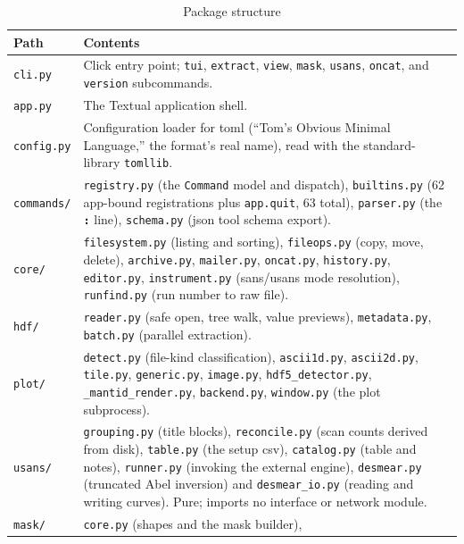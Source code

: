 \documentclass[tm]{ornltm}
\newcommand{\key}[1]{\textbf{\texttt{#1}}}
\begin{document}
\begin{table}[ht]
  \centering
  \caption{Package structure}
  \label{tab:layout}
  \small
  \begin{tabular}{l p{}}
    \toprule
    Path & Contents \\
    \midrule
    \texttt{cli.py} & Click entry point; \texttt{tui}, \texttt{extract},
      \texttt{view}, \texttt{mask}, \texttt{usans}, \texttt{oncat}, and
      \texttt{version} subcommands. \\
    \texttt{app.py} & The Textual application shell. \\
    \texttt{config.py} & Configuration loader for \ac{toml}
      \autocite{toml} (``Tom's Obvious Minimal Language,'' the format's real
      name), read with the standard-library \texttt{tomllib}. \\
    \texttt{commands/} & \texttt{registry.py} (the \texttt{Command} model and
      dispatch), \texttt{builtins.py} (62 app-bound registrations plus
      \texttt{app.quit}, 63 total),
      \texttt{parser.py} (the \key{:} line), \texttt{schema.py} (\ac{json} tool
      schema export). \\
    \texttt{core/} & \texttt{filesystem.py} (listing and sorting),
      \texttt{fileops.py} (copy, move, delete), \texttt{archive.py},
      \texttt{mailer.py}, \texttt{oncat.py}, \texttt{history.py},
      \texttt{editor.py}, \texttt{instrument.py} (\ac{sans}/\ac{usans} mode
      resolution), \texttt{runfind.py} (run number to raw file). \\
    \texttt{hdf/} & \texttt{reader.py} (safe open, tree walk, value previews),
      \texttt{metadata.py}, \texttt{batch.py} (parallel extraction). \\
    \texttt{plot/} & \texttt{detect.py} (file-kind classification),
      \texttt{ascii1d.py}, \texttt{ascii2d.py}, \texttt{tile.py},
      \texttt{generic.py}, \texttt{image.py}, \texttt{hdf5\_detector.py},
      \texttt{\_mantid\_render.py}, \texttt{backend.py}, \texttt{window.py}
      (the plot subprocess). \\
    \texttt{usans/} & \texttt{grouping.py} (title blocks), \texttt{reconcile.py}
      (scan counts derived from disk), \texttt{table.py} (the setup \ac{csv}),
      \texttt{catalog.py} (table and notes), \texttt{runner.py} (invoking the
      external engine), \texttt{desmear.py} (truncated Abel inversion) and
      \texttt{desmear\_io.py} (reading and writing curves). Pure; imports no
      interface or network module. \\
    \texttt{mask/} & \texttt{core.py} (shapes and the mask builder),

\end{tabular}
\end{table}
\end{document}
